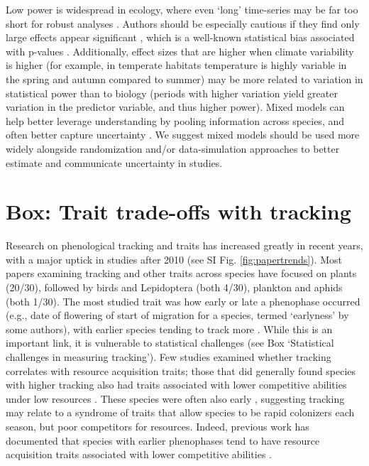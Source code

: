 \documentclass[11pt,letterpaper]{article}
\begin{document}
Low power is widespread in ecology, where even `long' time-series may be far too short for robust analyses \citep{bolmgren2013,kharouba2018}. Authors should be especially cautious if they find only large effects appear significant \citep[e.g.,][]{CaraDonna2014}, which is a well-known statistical bias associated with p-values \citep{loken2017}. Additionally, effect sizes that are higher when climate variability is higher (for example, in temperate habitats temperature is highly variable in the spring and autumn compared to summer) may be more related to variation in statistical power than to biology (periods with higher variation yield greater variation in the predictor variable, and thus higher power). Mixed models can help better leverage understanding by pooling information across species, and often better capture uncertainty \citep{pearse2017}. We suggest mixed models should be used more widely alongside randomization and/or data-simulation approaches \citep[e.g.,][]{bolmgren2013,kharouba2018} to better estimate and communicate uncertainty in studies. 


\section{Box: Trait trade-offs with tracking}
Research on phenological tracking and traits has increased greatly in recent years, with a major uptick in studies after 2010 (see SI Fig. \ref{fig:papertrends}). Most papers examining tracking and other traits across species have focused on plants (20/30), followed by birds and Lepidoptera (both 4/30), plankton and aphids (both 1/30). The most studied trait was how early or late a phenophase occurred (e.g., date of flowering of start of migration for a species, termed `earlyness' by some authors), with earlier species tending to track more \citep[studies included both birds and Lepidotera,][]{Diamond:2011nx,Ishioka2013,kharouba2014,jing2016,du2017}. While this is an important link, it is vulnerable to statistical challenges (see Box `Statistical challenges in measuring tracking'). Few studies examined whether tracking correlates with resource acquisition traits; those that did generally found species with higher tracking also had traits associated with lower competitive abilities under low resources \citep[e.g., being shallower or lacking a taproot rooted][]{Dorji2013,lasky2016,Zhu2016BioLetters}. These species were often also early \citep[e.g.,][]{Dorji2013,Zhu2016BioLetters}, suggesting tracking may relate to a syndrome of traits that allow species to be rapid colonizers each season, but poor competitors for resources. Indeed, previous work has documented that species with earlier phenophases tend to have resource acquisition traits associated with lower competitive abilities \citep[e.g., they tend to be of lower height, have shallower roots, narrower diameter vessels, thinner leaves, and grow faster, reviewed in][]{wolkovich2014aob}. 
\end{document}

